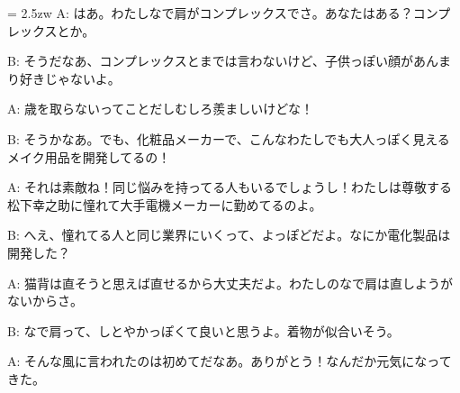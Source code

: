 \documentclass[11pt]{amsart}
\title{}
\author{}
\newenvironment{hangall}[1]{\hangindent = 2.5zw\everypar{\hangindent = 2.5zw}}{}
\begin{document}
\maketitle
\begin{hangall}{}%
A: はあ。わたしなで肩がコンプレックスでさ。あなたはある？コンプレックスとか。



B: そうだなあ、コンプレックスとまでは言わないけど、子供っぽい顔があんまり好きじゃないよ。



A: 歳を取らないってことだしむしろ羨ましいけどな！



B: そうかなあ。でも、化粧品メーカーで、こんなわたしでも大人っぽく見えるメイク用品を開発してるの！



A: それは素敵ね！同じ悩みを持ってる人もいるでしょうし！わたしは尊敬する松下幸之助に憧れて大手電機メーカーに勤めてるのよ。



B: へえ、憧れてる人と同じ業界にいくって、よっぽどだよ。なにか電化製品は開発した？



A: 猫背は直そうと思えば直せるから大丈夫だよ。わたしのなで肩は直しようがないからさ。



B: なで肩って、しとやかっぽくて良いと思うよ。着物が似合いそう。



A: そんな風に言われたのは初めてだなあ。ありがとう！なんだか元気になってきた。\end{hangall}
\end{document}
